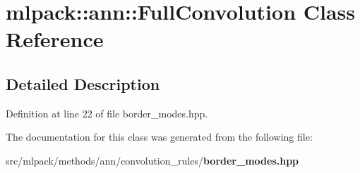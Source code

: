 \section{mlpack\+:\+:ann\+:\+:Full\+Convolution Class Reference}
\label{classmlpack_1_1ann_1_1FullConvolution}


\subsection{Detailed Description}


Definition at line 22 of file border\+\_\+modes.\+hpp.



The documentation for this class was generated from the following file\+:\begin{DoxyCompactItemize}
\item 
src/mlpack/methods/ann/convolution\+\_\+rules/{\bf border\+\_\+modes.\+hpp}\end{DoxyCompactItemize}
